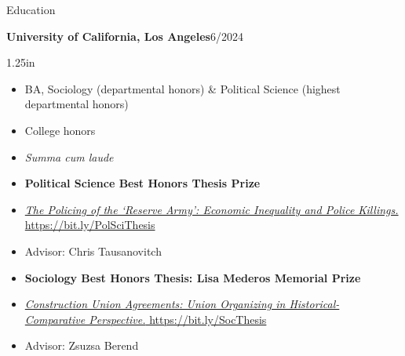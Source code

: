 \documentclass[12pt]{resume} %
\newcommand{\righthandindent}{1.25in}
\begin{document}
\thispagestyle{firstpagestyle}

\begin{rSection}{Education}

\textbf{University of California, Los Angeles}\hfill{}6/2024
\begin{adjustwidth}{0pt}{\righthandindent}
\vspace{-7pt}
\begin{itemize}
    \item[] BA, Sociology (departmental honors) \& Political Science (highest departmental honors)
    \item[] College honors
    \vspace{-7pt}
    \item[] \textit{Summa cum laude}
    \item[] \textbf{Political Science Best Honors Thesis Prize}
    \vspace{-7pt}
    \item[] \href{https://bit.ly/PolSciThesis}{\textit{The Policing of the `Reserve Army': Economic Inequality and Police Killings.} https://bit.ly/PolSciThesis}
    \vspace{-7pt}
    \item[] Advisor: Chris Tausanovitch
    \item[] \textbf{Sociology Best Honors Thesis: Lisa Mederos Memorial Prize}
    \vspace{-21pt}
    \item[] \href{https://bit.ly/SocThesis}{\textit{Construction Union Agreements: Union Organizing in Historical- \allowbreak{}Comparative Perspective.} https://bit.ly/SocThesis}
    \vspace{-7pt}
    \item[] Advisor: Zsuzsa Berend

\end{itemize}
\end{adjustwidth}


\end{rSection}
\end{document}
